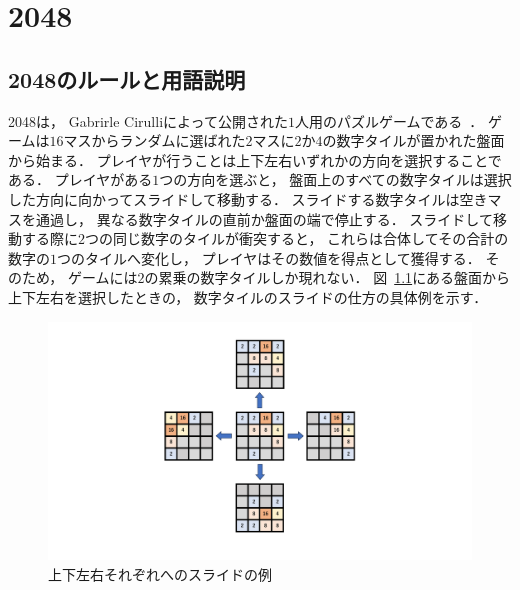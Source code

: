 \chapter{2048}

\section{2048のルールと用語説明}
\label{sec:rule}
2048は， Gabrirle Cirulliによって公開された$1$人用のパズルゲームである~\cite{2048}．
ゲームは$16$マスからランダムに選ばれた$2$マスに$2$か$4$の数字タイルが置かれた盤面から始まる．
プレイヤが行うことは上下左右いずれかの方向を選択することである． 
プレイヤがある$1$つの方向を選ぶと， 盤面上のすべての数字タイルは選択した方向に向かってスライドして移動する．
スライドする数字タイルは空きマスを通過し， 異なる数字タイルの直前か盤面の端で停止する．
スライドして移動する際に$2$つの同じ数字のタイルが衝突すると， これらは合体してその合計の数字の$1$つのタイルへ変化し， プレイヤはその数値を得点として獲得する．
そのため， ゲームには$2$の累乗の数字タイルしか現れない．
図~\ref{fig:all_directions}にある盤面から上下左右を選択したときの， 数字タイルのスライドの仕方の具体例を示す．
\begin{figure}[t]
    \centering
    \includegraphics[width=0.8\linewidth{}]{figures/all_directions.pdf}
    \caption{上下左右それぞれへのスライドの例}
    \label{fig:all_directions}
\end{figure}


